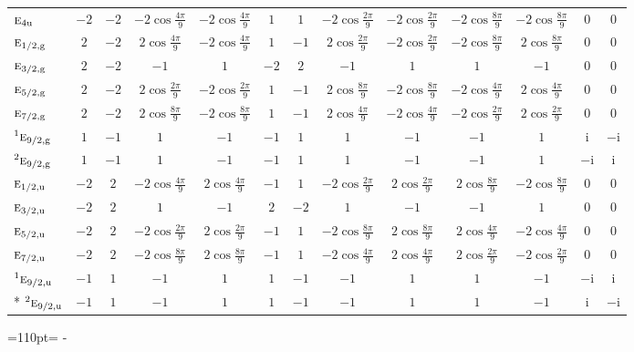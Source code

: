 \documentclass[10pt,a4paper]{article}
\makeatletter
\def\grouprule#1#2{\noalign{\marks\LTgroupmarks{\the\belowrulesep}\nobreak\vskip#1%
  \vskip\aboverulesep}\multispan\LT@cols\unskip{\leaders\hrule\@height#2\hfill\kern\z@}\cr
  \noalign{\penalty\LTrulebreak\vskip\belowrulesep\global\@lastruleclass\z@}}
\newcommand{\needspace}[1]{\par\penalty-100\begingroup\dimen0=#1\relax\dimen2=\pagegoal
  \advance\dimen2-\pagetotal\ifdim\dimen0>\dimen2\relax\ifdim\dimen2>0pt\vfil\break\fi\fi
  \endgroup}
\numberwithin{equation}{section}
\newcommand{\irr}[1]{\text{\normalfont\scshape #1}}
\newcommand{\conjpair}[1]{{}^{#1}}
\newcommand{\ptag}[1]{\mathrm{#1}}
\newcommand{\iunit}{\mathrm{i}}
\makeatother
\begin{document}
{{\begin{longtable}{@{}lcccccccccccc@{}}
$\irr{e}_{4\ptag{u}}$ & $-2$ & $-2$ & $-2\cos\tfrac{4\pi}{9}$ & $-2\cos\tfrac{4\pi}{9}$ & $1$ & $1$ & $-2\cos\tfrac{2\pi}{9}$ & $-2\cos\tfrac{2\pi}{9}$ & $-2\cos\tfrac{8\pi}{9}$ & $-2\cos\tfrac{8\pi}{9}$ & $0$ & $0$\\
\grouprule{0pt}{\lightrulewidth}
$\irr{e}_{1/2,\ptag{g}}$ & $2$ & $-2$ & $2\cos\tfrac{4\pi}{9}$ & $-2\cos\tfrac{4\pi}{9}$ & $1$ & $-1$ & $2\cos\tfrac{2\pi}{9}$ & $-2\cos\tfrac{2\pi}{9}$ & $-2\cos\tfrac{8\pi}{9}$ & $2\cos\tfrac{8\pi}{9}$ & $0$ & $0$\\
$\irr{e}_{3/2,\ptag{g}}$ & $2$ & $-2$ & $-1$ & $1$ & $-2$ & $2$ & $-1$ & $1$ & $1$ & $-1$ & $0$ & $0$\\
$\irr{e}_{5/2,\ptag{g}}$ & $2$ & $-2$ & $2\cos\tfrac{2\pi}{9}$ & $-2\cos\tfrac{2\pi}{9}$ & $1$ & $-1$ & $2\cos\tfrac{8\pi}{9}$ & $-2\cos\tfrac{8\pi}{9}$ & $-2\cos\tfrac{4\pi}{9}$ & $2\cos\tfrac{4\pi}{9}$ & $0$ & $0$\\
$\irr{e}_{7/2,\ptag{g}}$ & $2$ & $-2$ & $2\cos\tfrac{8\pi}{9}$ & $-2\cos\tfrac{8\pi}{9}$ & $1$ & $-1$ & $2\cos\tfrac{4\pi}{9}$ & $-2\cos\tfrac{4\pi}{9}$ & $-2\cos\tfrac{2\pi}{9}$ & $2\cos\tfrac{2\pi}{9}$ & $0$ & $0$\\
$\conjpair{1}\irr{e}_{9/2,\ptag{g}}$ & $1$ & $-1$ & $1$ & $-1$ & $-1$ & $1$ & $1$ & $-1$ & $-1$ & $1$ & $\iunit{}$ & $-\iunit{}$\\
$\conjpair{2}\irr{e}_{9/2,\ptag{g}}$ & $1$ & $-1$ & $1$ & $-1$ & $-1$ & $1$ & $1$ & $-1$ & $-1$ & $1$ & $-\iunit{}$ & $\iunit{}$\\
$\irr{e}_{1/2,\ptag{u}}$ & $-2$ & $2$ & $-2\cos\tfrac{4\pi}{9}$ & $2\cos\tfrac{4\pi}{9}$ & $-1$ & $1$ & $-2\cos\tfrac{2\pi}{9}$ & $2\cos\tfrac{2\pi}{9}$ & $2\cos\tfrac{8\pi}{9}$ & $-2\cos\tfrac{8\pi}{9}$ & $0$ & $0$\\
$\irr{e}_{3/2,\ptag{u}}$ & $-2$ & $2$ & $1$ & $-1$ & $2$ & $-2$ & $1$ & $-1$ & $-1$ & $1$ & $0$ & $0$\\
$\irr{e}_{5/2,\ptag{u}}$ & $-2$ & $2$ & $-2\cos\tfrac{2\pi}{9}$ & $2\cos\tfrac{2\pi}{9}$ & $-1$ & $1$ & $-2\cos\tfrac{8\pi}{9}$ & $2\cos\tfrac{8\pi}{9}$ & $2\cos\tfrac{4\pi}{9}$ & $-2\cos\tfrac{4\pi}{9}$ & $0$ & $0$\\
$\irr{e}_{7/2,\ptag{u}}$ & $-2$ & $2$ & $-2\cos\tfrac{8\pi}{9}$ & $2\cos\tfrac{8\pi}{9}$ & $-1$ & $1$ & $-2\cos\tfrac{4\pi}{9}$ & $2\cos\tfrac{4\pi}{9}$ & $2\cos\tfrac{2\pi}{9}$ & $-2\cos\tfrac{2\pi}{9}$ & $0$ & $0$\\
$\conjpair{1}\irr{e}_{9/2,\ptag{u}}$ & $-1$ & $1$ & $-1$ & $1$ & $1$ & $-1$ & $-1$ & $1$ & $1$ & $-1$ & $-\iunit{}$ & $\iunit{}$\\*
$\conjpair{2}\irr{e}_{9/2,\ptag{u}}$ & $-1$ & $1$ & $-1$ & $1$ & $1$ & $-1$ & $-1$ & $1$ & $1$ & $-1$ & $\iunit{}$ & $-\iunit{}$\\
\bottomrule\end{longtable}}}
\needspace{110pt}
\end{document}
